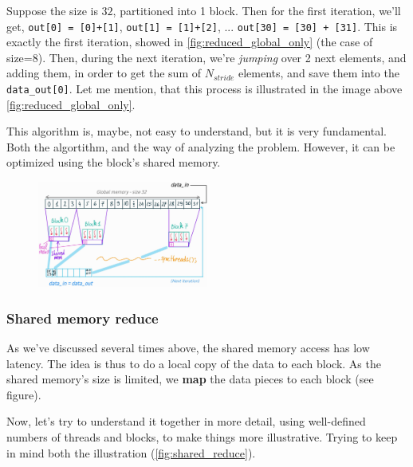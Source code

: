 \documentclass[12pt]{article}
\begin{document}
Suppose the size is $32$, partitioned into 1 block. Then for the first iteration, we'll get, 
\verb|out[0] = [0]+[1]|, \verb|out[1] = [1]+[2]|, ... \verb|out[30] = [30] + [31]|. This is exactly the first iteration, 
showed in \autoref{fig:reduced_global_only} (the case of size=8). Then, during the next iteration, we're 
\textit{jumping} over 2 next elements, and adding them, in order to get the sum of $N_{stride}$ elements, and save them 
into the \verb|data_out[0]|. Let me mention, that this process is illustrated in the image above \autoref{fig:reduced_global_only}.

This algorithm is, maybe, not easy to understand, but it is very fundamental. Both the algortithm, and the 
way of analyzing the problem. However, it can be optimized using the block's shared memory.


\begin{figure}
   \vspace{-0.9cm}
   \begin{center}
   \includegraphics[width=0.5\textwidth]{shared_reduce.jpg}
   \end{center}
   \vspace{-0.5cm}
   \captionsetup{justification=raggedleft}
   \caption{}
   \label{fig:shared_reduce}
\end{figure}





\subsubsection*{Shared memory reduce}
As we've discussed several times above, the shared memory access has low latency. The idea is thus 
to do a local copy of the data to each block. As the shared memory's size is limited, we \textbf{map} the 
data pieces to each block (see figure).

Now, let's try to understand it together in more detail, using well-defined numbers of threads and blocks, 
to make things more illustrative. Trying to keep in mind both the illustration (\autoref{fig:shared_reduce}).
\end{document}
